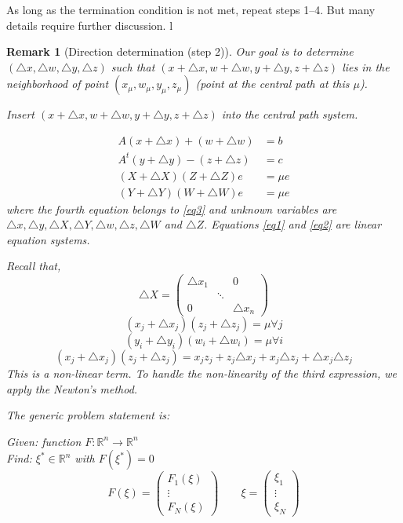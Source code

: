 \documentclass[a4paper]{article}
\numberwithin{lecref}{subsection}
\newtheorem*{Remark}{Remark}
\begin{document}
As long as the termination condition is not met, repeat steps 1--4.
But many details require further discussion.
l
\begin{Remark}[Direction determination (step 2)]
	Our goal is to determine $(\triangle x, \triangle w, \triangle y, \triangle z)$ such that $(x + \triangle x, w + \triangle w, y + \triangle y, z + \triangle z)$ lies in the neighborhood of point $(x_\mu, w_\mu, y_\mu, z_\mu)$ (point at the central path at this $\mu$).

	Insert $(x + \triangle x, w + \triangle w, y + \triangle y, z + \triangle z)$ into the central path system.

	\begin{align}
		A(x + \triangle x) + (w + \triangle w) &= b \label{eq1}\\
		A^t(y + \triangle y) - (z + \triangle z) &= c \label{eq2}\\
		(X + \triangle X)(Z + \triangle Z) e &= \mu e \label{eq3}\\
		(Y + \triangle Y)(W + \triangle W) e &= \mu e \nonumber
	\end{align}
	where the fourth equation belongs to \ref{eq3} and unknown variables are $\triangle x, \triangle y, \triangle X, \triangle Y, \triangle w, \triangle z, \triangle W$ and $\triangle Z$.
	Equations \ref{eq1} and \ref{eq2} are linear equation systems.

	Recall that,
	\[
		\triangle X = \begin{pmatrix}
			\triangle x_1 & & 0 \\
			& \ddots & \\
			0 & & \triangle x_n
		\end{pmatrix}
	\]
	\[ (x_j + \triangle x_j) (z_j + \triangle z_j) = \mu \forall j \]
	\[ (y_i + \triangle y_i) (w_i + \triangle w_i) = \mu \forall i \]
	\[ (x_j + \triangle x_j) (z_j + \triangle z_j) = x_j z_j + z_j \triangle x_j + x_j \triangle z_j + \triangle x_j \triangle z_j \]
	This is a non-linear term. To handle the non-linearity of the third expression, we apply the Newton's method.

	The generic problem statement is:

	\emph{Given:} function $F: \mathbb R^n \to \mathbb R^n$ \\
	\emph{Find:} $\xi^* \in \mathbb R^n$ with $F(\xi^*) = 0$
	\[ F(\xi) = \begin{pmatrix} F_1(\xi) \\ \vdots \\ F_N(\xi) \end{pmatrix} \qquad \xi = \begin{pmatrix} \xi_1 \\ \vdots \\ \xi_N \end{pmatrix} \]


\end{Remark}
\end{document}

